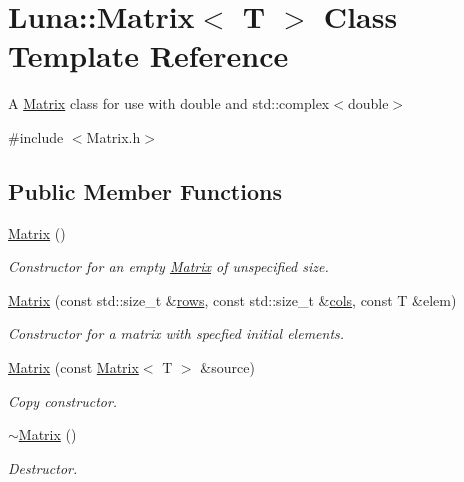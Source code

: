 \hypertarget{classLuna_1_1Matrix}{}\section{Luna\+:\+:Matrix$<$ T $>$ Class Template Reference}
\label{classLuna_1_1Matrix}


A \hyperlink{classLuna_1_1Matrix}{Matrix} class for use with double and std\+::complex$<$double$>$  




{\ttfamily \#include $<$Matrix.\+h$>$}

\subsection*{Public Member Functions}
\begin{DoxyCompactItemize}
\item 
\hyperlink{classLuna_1_1Matrix_a70f4051bba3f6c58f85bf8a9237673e0}{Matrix} ()
\begin{DoxyCompactList}\small\item\em Constructor for an empty \hyperlink{classLuna_1_1Matrix}{Matrix} of unspecified size. \end{DoxyCompactList}\item 
\hyperlink{classLuna_1_1Matrix_a88325043c4504e0af3bfff5bf3fe0ead}{Matrix} (const std\+::size\+\_\+t \&\hyperlink{classLuna_1_1Matrix_ae7b0b30c3e22ba252d660f093757295e}{rows}, const std\+::size\+\_\+t \&\hyperlink{classLuna_1_1Matrix_aa7472f90f4c470535e722f3a389a19b1}{cols}, const T \&elem)
\begin{DoxyCompactList}\small\item\em Constructor for a matrix with specfied initial elements. \end{DoxyCompactList}\item 
\hyperlink{classLuna_1_1Matrix_a02f3303435507251a785621129e79cd9}{Matrix} (const \hyperlink{classLuna_1_1Matrix}{Matrix}$<$ T $>$ \&source)
\begin{DoxyCompactList}\small\item\em Copy constructor. \end{DoxyCompactList}\item 
\hyperlink{classLuna_1_1Matrix_a0f7b24616cfbe1bf102f2fe1b1bbc0fa}{$\sim$\+Matrix} ()
\begin{DoxyCompactList}\small\item\em Destructor. \end{DoxyCompactList}\item 

\end{DoxyCompactItemize}
